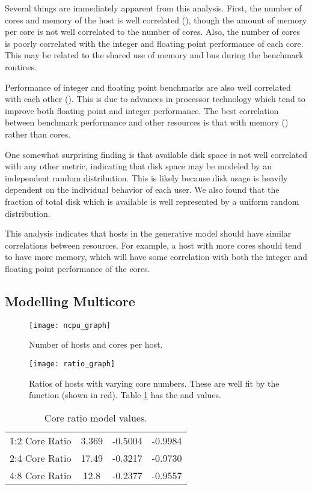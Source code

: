 \documentclass[conference]{IEEEtran}
\begin{document}
Several things are immediately apparent from this analysis.  First, the number of cores and memory of the host is well correlated (), though the amount of memory per core is not well correlated to the number of cores.  Also, the number of cores is poorly correlated with the integer and floating point performance of each core.  This may be related to the shared use of memory and bus during the benchmark routines.

Performance of integer and floating point benchmarks are also well correlated with each other ().  This is due to advances in processor technology which tend to improve both floating point and integer performance.  The best correlation between benchmark performance and other resources is that with memory () rather than cores.

One somewhat surprising finding is that available disk space is not well correlated with any other metric, indicating that disk space may be modeled by an independent random distribution.  This is likely because disk usage is heavily dependent on the individual behavior of each user.  We also found that the fraction of total disk which is available is well represented by a uniform random distribution.

This analysis indicates that hosts in the generative model should have similar correlations between resources.  For example, a host with more cores should tend to have more memory, which will have some correlation with both the integer and floating point performance of the cores.

\subsection{Modelling Multicore}
\label{sec-model-core}

\begin{figure}[!t]
\centering
\texttt{[image: ncpu\_graph]}
\caption{Number of hosts and cores per host.}
\label{fig-ncpu-graph}
\end{figure}

\begin{figure}[!t]
\centering
\texttt{[image: ratio\_graph]}
\caption{Ratios of hosts with varying core numbers.  These are well fit by the function  (shown in red). Table \ref{core-ratio-val-table} has the  and  values.}
\label{fig-ratio-graph}
\end{figure}

\begin{table}
\caption{Core ratio model values.}
\centering
\begin{tabular}{|c|c|c|c|}
\hline
&  &  &  \\
\hline
1:2 Core Ratio & 3.369 & -0.5004 & -0.9984 \\
\hline
2:4 Core Ratio & 17.49 & -0.3217 & -0.9730 \\
\hline
4:8 Core Ratio & 12.8 & -0.2377 & -0.9557 \\
\hline
\end{tabular}
\label{core-ratio-val-table}
\end{table}
\end{document}
